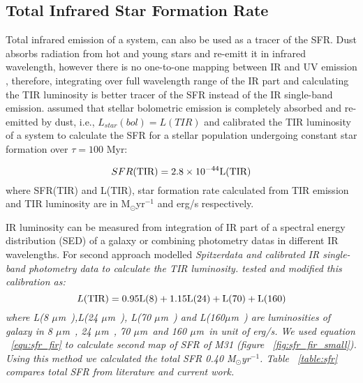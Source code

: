 \documentclass[useAMS,usenatbib]{mn2e}
\newcommand \um    {$\mu$m\ }
\newcommand \Spitzer {\it Spitzer}
\begin{document}
\subsection{Total Infrared Star Formation Rate}
\label{sec:sfr_fir}
Total infrared emission of a system, can also be used as a tracer of the SFR. Dust absorbs radiation from hot and young stars and re-emitt it in infrared wavelength, however there is no one-to-one mapping between IR and UV emission \citep{Calzeti12}, therefore, integrating over full wavelength range of the IR part and calculating the TIR luminosity is better tracer of the SFR instead of the IR single-band emission. \cite{Calzetti07} assumed that stellar bolometric emission is completely absorbed and re-emitted by dust, i.e., $L_{star}(bol) = L(TIR)$ and calibrated the TIR luminosity of a system to calculate the SFR for a stellar population undergoing constant star formation over $\tau = 100$ Myr:

\begin{equation}
\label{equ:sfr_fir}
SFR(\rm TIR) = 2.8 \times10^{-44}L(\rm TIR)
\end{equation}
where SFR(TIR) and L(TIR), star formation rate calculated from TIR emission and TIR luminosity are in M$_{\odot}$yr$^{-1}$ and erg/s respectively.


IR luminosity can be measured from integration of IR part of a spectral energy distribution (SED) of a galaxy or combining photometry datas in different IR wavelengths. For second approach \cite{Draine07} modelled \Spitzer data and calibrated IR single-band photometry data to calculate the TIR luminosity. \cite{Boquien10} tested and modified this calibration as:
\begin{equation}
 \label{equ: TIR}
L(\rm TIR) = 0.95L(8) + 1.15L(24) + L(70) + L(160)
\end{equation}
where L(8 \um),L(24 \um), L(70 \um) and L(160\um) are luminosities of galaxy in 8 \um, 24 \um, 70 \um and 160 \um in unit of erg/s. We used equation ~\ref{equ:sfr_fir} to calculate second map of SFR of M31 (figure ~\ref{fig:sfr_fir_small}). Using this method we calculated the total SFR 0.40  M$_{\odot}$yr$^{-1}$. Table ~\ref{table:sfr} compares total SFR from literature and current work.
\end{document}
